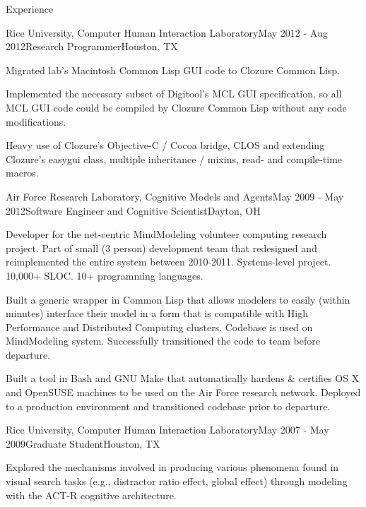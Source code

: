 
\begin{rSection}{Experience}

\begin{rSubsection}{Rice University, Computer Human Interaction Laboratory}{May 2012 - Aug 2012}{Research Programmer}{Houston, TX}
\item Migrated lab's Macintosh Common Lisp GUI code to Clozure Common Lisp. 
\item Implemented the necessary subset of Digitool's MCL GUI specification, so all MCL GUI code could be compiled by Clozure Common Lisp without any code modifications.
\item Heavy use of Clozure's Objective-C / Cocoa bridge, CLOS and extending Clozure's easygui class, multiple inheritance / mixins, read- and compile-time macros.
\end{rSubsection}

\begin{rSubsection}{Air Force Research Laboratory, Cognitive Models and Agents}{May 2009 - May 2012}{Software Engineer and Cognitive Scientist}{Dayton, OH}
\item Developer for the net-centric MindModeling volunteer computing research project.
Part of small (3 person) development team that redesigned and reimplemented the entire system between 2010-2011.
Systems-level project. 10,000+ SLOC. 10+ programming languages.
\item Built a generic wrapper in Common Lisp that allows modelers to easily
(within minutes) interface their model in a form that is compatible with High Performance and Distributed Computing clusters.
Codebase is used on MindModeling system.
Successfully transitioned the code to team before departure.
\item Built a tool in Bash and GNU Make that automatically hardens \& certifies OS X and OpenSUSE machines to be used on the Air Force research network.
Deployed to a production environment and transitioned codebase prior to departure.
\end{rSubsection}

\begin{rSubsection}{Rice University, Computer Human Interaction Laboratory}{May 2007 - May 2009}{Graduate Student}{Houston, TX}
\item Explored the mechanisms involved in producing various phenomena found in visual search tasks
(e.g., distractor ratio effect, global effect) through modeling with the ACT-R cognitive architecture. 
\end{rSubsection}


\end{rSection}
